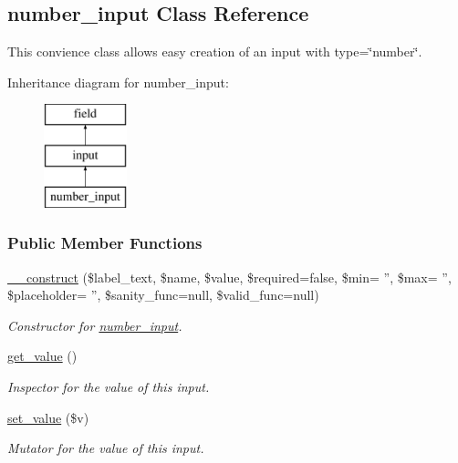 \hypertarget{classnumber__input}{\subsection{number\-\_\-input Class Reference}
\label{classnumber__input}
}


This convience class allows easy creation of an input with type=\char`\"{}number\char`\"{}.  


Inheritance diagram for number\-\_\-input\-:\begin{figure}[H]
\begin{center}
\leavevmode
\includegraphics[height=3.000000cm]{classnumber__input}
\end{center}
\end{figure}
\subsubsection*{Public Member Functions}
\begin{DoxyCompactItemize}
\item 
\hyperlink{classnumber__input_a6850b71ee7cf3f7733bf84fe7dd085bb}{\-\_\-\-\_\-construct} (\$label\-\_\-text, \$name, \$value, \$required=false, \$min= '', \$max= '', \$placeholder= '', \$sanity\-\_\-func=null, \$valid\-\_\-func=null)
\begin{DoxyCompactList}\small\item\em Constructor for \hyperlink{classnumber__input}{number\-\_\-input}. \end{DoxyCompactList}\item 
\hyperlink{classnumber__input_ac3cbe1ec02ef79588e1dbf5d2360b84e}{get\-\_\-value} ()
\begin{DoxyCompactList}\small\item\em Inspector for the value of this input. \end{DoxyCompactList}\item 
\hyperlink{classnumber__input_a8026b12c0bf4c8ea0ad303a532ed7230}{set\-\_\-value} (\$v)
\begin{DoxyCompactList}\small\item\em Mutator for the value of this input. \end{DoxyCompactList}\end{DoxyCompactItemize}
